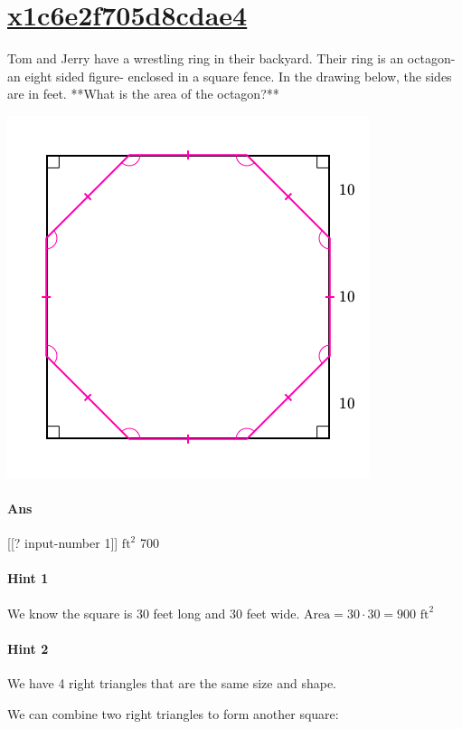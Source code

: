 \documentclass[twocolumn,10pt]{article}
\def\shrinkfactor{0.55}
\begin{document}
\section{\href{https://www.khanacademy.org/devadmin/content/items/x1c6e2f705d8cdae4}{x1c6e2f705d8cdae4}}

\noindent
Tom and Jerry have a wrestling ring in their backyard.  Their ring is an octagon- an eight sided figure- enclosed in a square fence.  In the drawing below, the sides are in feet.  **What is the area of the octagon?**


\includegraphics[scale=\shrinkfactor]{figures/dbc27f28399165541bacc602846575cddbd21659.png}

\paragraph{Ans}  [[? input-number 1]] $\text{ft}^2$  700

\paragraph{Hint 1}We know the square is $30$ feet long and $30$ feet wide.  
${\text{Area}}=30\cdot30=900\text{ ft}^2$  

\paragraph{Hint 2}We have 4 right triangles that are the same size and shape.  

We can combine two right triangles to form another square: 
\end{document}
